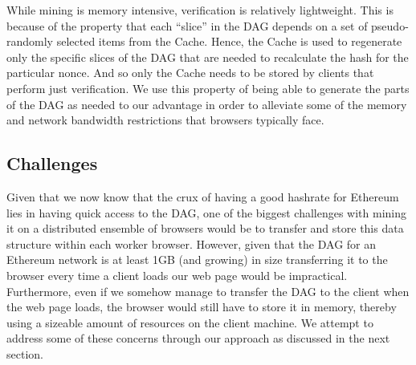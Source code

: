 \documentclass[runningheads]{llncs}
\newcommand{\trishita}[1]{{\color{magenta}\bfseries[Trishita: #1]}}
\begin{document}

While mining is memory intensive, verification is relatively lightweight. This is because of the property that each ``slice'' in the DAG depends on a set of pseudo-randomly selected items from the Cache. Hence, the Cache is used to regenerate only the specific slices of the DAG that are needed to recalculate the hash for the particular nonce. And so only the Cache needs to be stored by clients that perform just verification. We use this property of being able to generate the parts of the DAG as needed to our advantage in order to alleviate some of the memory and network bandwidth restrictions that browsers typically face.



\subsection{Challenges}
Given that we now know that the crux of having a good hashrate for Ethereum lies in having quick access to the DAG, one of the biggest challenges with mining it on a distributed ensemble of browsers would be to transfer and store this data structure within each worker browser. However, given that the DAG for an Ethereum network is at least 1GB (and growing) in size transferring it to the browser every time a client loads our web page would be impractical. Furthermore, even if we somehow manage to transfer the DAG to the client when the web page loads, the browser would still have to store it in memory, thereby using a sizeable amount of resources on the client machine. We attempt to address some of these concerns through our approach as discussed in the next section. 
\end{document}
